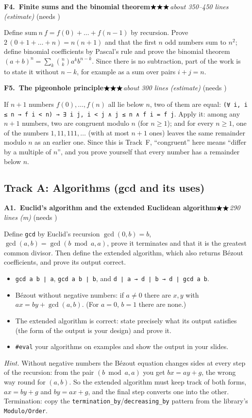 \documentclass[11pt]{article}
\newcommand{\lean}[1]{\texttt{#1}}
\newcommand{\stars}[1]{\ensuremath{%
  \ifcase#1\or\bigstar\or\bigstar\bigstar\or\bigstar\bigstar\bigstar\or
  \bigstar\bigstar\bigstar\bigstar\or\bigstar\bigstar\bigstar\bigstar\bigstar\fi}}
\newcommand{\topic}[5]{%
  \par\medskip\noindent\textbf{#1.\ #2}\hfill\quad\stars{#3}\enspace\textit{#4}%
  \ifx\relax#5\relax\else\enspace(needs #5)\fi\par\nopagebreak}
\begin{document}
\topic{F4}{Finite sums and the binomial theorem}{3}{about 350--450 lines (estimate)}{}
Define $\mathrm{sum}\ n\ f = f(0) + \dots + f(n-1)$ by recursion. Prove
$2\,(0 + 1 + \dots + n) = n(n+1)$ and that the first $n$ odd numbers sum to $n^2$; define
binomial coefficients by Pascal's rule and prove the binomial theorem
$(a+b)^n = \sum_k \binom{n}{k} a^k b^{n-k}$. Since there is no subtraction, part of the work is
to state it without $n - k$, for example as a sum over pairs $i + j = n$.

\topic{F5}{The pigeonhole principle}{3}{about 300 lines (estimate)}{}
If $n+1$ numbers $f(0), \dots, f(n)$ all lie below $n$, two of them are equal:
\lean{(∀ i, i ≤ n → f i < n) → ∃ i j, i < j ∧ j ≤ n ∧ f i = f j}. Apply it: among any $n + 1$
numbers, two are congruent modulo $n$ (for $n \ge 1$); and for every $n \ge 1$, one of the numbers
$1, 11, 111, \dots$ (with at most $n + 1$ ones) leaves the same remainder modulo $n$ as an earlier
one. Since this is Track~F, ``congruent'' here means ``differ by a multiple of $n$'', and you prove
yourself that every number has a remainder below $n$.

\subsection*{Track A: Algorithms (gcd and its uses)}

\topic{A1}{Euclid's algorithm and the extended Euclidean algorithm}{2}{290 lines (m)}{}
Define \lean{gcd} by Euclid's recursion $\gcd(0, b) = b$, $\gcd(a, b) = \gcd(b \bmod a, a)$,
prove it terminates and that it is the greatest common divisor. Then define the extended
algorithm, which also returns B\'ezout coefficients, and prove its output correct.
\begin{itemize}
\item \lean{gcd a b ∣ a}, \lean{gcd a b ∣ b}, and \lean{d ∣ a → d ∣ b → d ∣ gcd a b}.
\item B\'ezout without negative numbers: if $a \ne 0$ there are $x, y$ with
  $a x = b y + \gcd(a, b)$. (For $a = 0$, $b = 1$ there are none.)
\item The extended algorithm is correct: state precisely what its output satisfies (the form of
  the output is your design) and prove it.
\item \lean{\#eval} your algorithms on examples and show the output in your slides.
\end{itemize}
\emph{Hint.} Without negative numbers the B\'ezout equation changes sides at every step of the
recursion: from the pair $(b \bmod a, a)$ you get $b x = a y + g$, the wrong way round for
$(a, b)$. So the extended algorithm must keep track of both forms, $a x = b y + g$ and
$b y = a x + g$, and the final step converts one into the other. Termination: copy the
\lean{termination\_by}/\lean{decreasing\_by} pattern from the library's \lean{Modulo/Order}.
\end{document}
